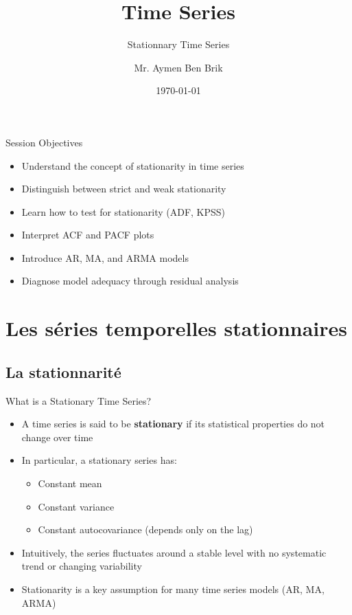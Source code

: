 \documentclass[aspectratio=169]{beamer}
\title{Time Series}
\subtitle{Stationnary Time Series}
\author{Mr. Aymen Ben Brik}
\institute{
Time Series Course 1GAMMA
}
\date{\today}
\begin{document}
\begin{frame}
\titlepage
\end{frame}

\begin{frame}{Session Objectives}
\begin{itemize}
    \item Understand the concept of stationarity in time series
    \item Distinguish between strict and weak stationarity
    \item Learn how to test for stationarity (ADF, KPSS)
    \item Interpret ACF and PACF plots
    \item Introduce AR, MA, and ARMA models
    \item Diagnose model adequacy through residual analysis
\end{itemize}
\end{frame}

\section{Les séries temporelles stationnaires}

\subsection{La stationnarité}
\begin{frame}{What is a Stationary Time Series?}
\begin{itemize}
    \item A time series is said to be \textbf{stationary} if its statistical properties do not change over time
    \vspace{0.3cm}
    \item In particular, a stationary series has:
    \begin{itemize}
        \item Constant mean
        \item Constant variance
        \item Constant autocovariance (depends only on the lag)
    \end{itemize}
    \vspace{0.3cm}
    \item Intuitively, the series fluctuates around a stable level with no systematic trend or changing variability
    \vspace{0.3cm}
    \item Stationarity is a key assumption for many time series models (AR, MA, ARMA)
\end{itemize}
\end{frame}
\end{document}

